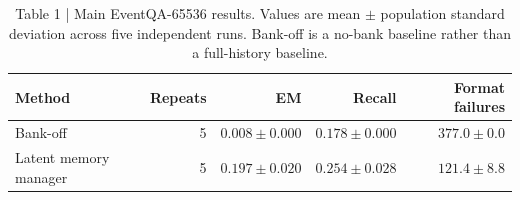 \begin{table}[t]
\centering
\begin{tabular}{lrrrr}
\toprule
Method & Repeats & EM & Recall & Format failures \\
\midrule
Bank-off & 5 & $0.008\pm0.000$ & $0.178\pm0.000$ & $377.0\pm0.0$ \\
Latent memory manager & 5 & \textbf{$0.197\pm0.020$} & \textbf{$0.254\pm0.028$} & \textbf{$121.4\pm8.8$} \\
\bottomrule
\end{tabular}
\caption{Table 1 | Main EventQA-65536 results. Values are mean $\pm$ population standard deviation across five independent runs. Bank-off is a no-bank baseline rather than a full-history baseline.}
\label{tab:main-eventqa-results}
\end{table}
